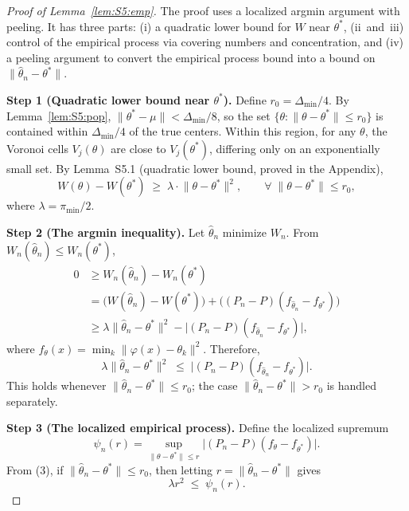 \documentclass[twoside]{article}
\theoremstyle{plain}
\theoremstyle{definition}
\theoremstyle{remark}
\newcommand{\1}{\mathbf{1}}
\renewcommand{\phi}{\varphi}
\newcommand{\htheta}{\hat{\theta}}
\newcommand{\norm}[1]{\lVert#1\rVert}
\begin{document}
\begin{proof}[Proof of Lemma~\ref{lem:S5:emp}]
The proof uses a localized argmin argument with peeling.  It has three
parts: (i) a quadratic lower bound for $W$ near $\theta^*$,
(ii~and~iii) control of the empirical process via covering numbers and
concentration, and (iv) a peeling argument to convert the empirical
process bound into a bound on $\norm{\htheta_n-\theta^*}$.

\noindent\textbf{Step 1 (Quadratic lower bound near $\theta^*$).}
Define $r_0=\Delta_{\min}/4$.  By Lemma~\ref{lem:S5:pop},
$\norm{\theta^*-\mu}<\Delta_{\min}/8$, so the set
$\{\theta:\norm{\theta-\theta^*}\le r_0\}$ is contained within
$\Delta_{\min}/4$ of the true centers.  Within this region, for any
$\theta$, the Voronoi cells $V_j(\theta)$ are close to $V_j(\theta^*)$,
differing only on an exponentially small set.  By Lemma~S5.1 (quadratic
lower bound, proved in the Appendix),
\[
W(\theta)-W(\theta^*)\;\ge\;\lambda\cdot\norm{\theta-\theta^*}^2,
\qquad \forall\;\norm{\theta-\theta^*}\le r_0,
\tag{2}
\]
where $\lambda=\pi_{\min}/2$.

\noindent\textbf{Step 2 (The argmin inequality).}
Let $\htheta_n$ minimize $W_n$.  From $W_n(\htheta_n)\le W_n(\theta^*)$,
\begin{align*}
0 &\ge W_n(\htheta_n)-W_n(\theta^*) \\
  &= \bigl(W(\htheta_n)-W(\theta^*)\bigr)
     + \bigl((P_n-P)(f_{\htheta_n}-f_{\theta^*})\bigr) \\
  &\ge \lambda\norm{\htheta_n-\theta^*}^2
     - \bigl|(P_n-P)(f_{\htheta_n}-f_{\theta^*})\bigr|,
\end{align*}
where $f_\theta(x)=\min_k\norm{\phi(x)-\theta_k}^2$.  Therefore,
\begin{equation}
\lambda\norm{\htheta_n-\theta^*}^2
\;\le\; \bigl|(P_n-P)(f_{\htheta_n}-f_{\theta^*})\bigr|.
\tag{3}
\end{equation}
This holds whenever $\norm{\htheta_n-\theta^*}\le r_0$; the case
$\norm{\htheta_n-\theta^*}>r_0$ is handled separately.

\noindent\textbf{Step 3 (The localized empirical process).}
Define the localized supremum
\[
\psi_n(r)=\sup_{\norm{\theta-\theta^*}\le r}
          \bigl|(P_n-P)(f_\theta-f_{\theta^*})\bigr|.
\]
From (3), if $\norm{\htheta_n-\theta^*}\le r_0$, then letting
$r=\norm{\htheta_n-\theta^*}$ gives
\begin{equation}
\lambda r^2 \;\le\; \psi_n(r).
\tag{4}
\end{equation}


\end{proof}
\end{document}
